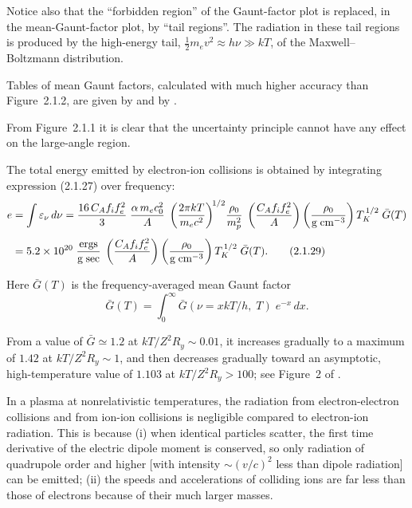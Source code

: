 Notice also that the ``forbidden region'' of the Gaunt-factor plot is replaced, in
the mean-Gaunt-factor plot, by ``tail regions''.  The radiation in these tail regions
is produced by the high-energy tail, $\frac{1}{2}m_e v^2 \approx h\nu \gg kT$, of the Maxwell--Boltzmann
distribution.

Tables of mean Gaunt factors, calculated with much higher accuracy than
Figure~2.1.2, are given by \citet{Green1959} and by \citet{Karzas1961}.

From Figure~2.1.1 it is clear that the uncertainty principle cannot have any
effect on the large-angle region.


The total energy emitted by electron-ion collisions is obtained by integrating
expression (2.1.27) over frequency:
\begin{align}
e &= \int \varepsilon_\nu\,d\nu
= \frac{16\,C_A f_i f_e^2}{3}\;
\frac{\alpha\,m_e c^2_0}{A}\;
\left(\frac{2\pi kT}{m_e c^2}\right)^{\!1/2}\!
\frac{\rho_0}{m_p^2}\;
\left(\frac{C_A f_i f_e^2}{A}\right)
\left(\frac{\rho_0}{\text{g\;cm}^{-3}}\right)
T_K^{\,1/2}\;\bar{G}(T)
\notag\\[4pt]
&= 5.2 \times 10^{20}\;
\frac{\text{ergs}}{\text{g\;sec}}\;
\left(\frac{C_A f_i f_e^2}{A}\right)
\left(\frac{\rho_0}{\text{g\;cm}^{-3}}\right)
T_K^{\,1/2}\;\bar{G}(T).
\tag{2.1.29}
\end{align}

Here $\bar{G}(T)$ is the frequency-averaged mean Gaunt factor
\begin{equation}
\bar{G}(T) = \int_0^\infty \bar{G}(\nu = xkT/h,\;T)\;e^{-x}\,dx.
\tag{2.1.30}
\end{equation}

From a value of $\bar{G} \simeq 1.2$ at $kT/Z^2 R_y \sim 0.01$, it increases gradually to a maximum
of $1.42$ at $kT/Z^2 R_y \sim 1$, and then decreases gradually toward an asymptotic,
high-temperature value of $1.103$ at $kT/Z^2 R_y > 100$; see Figure~2 of \citet{Green1959}.

In a plasma at nonrelativistic temperatures, the radiation from electron-electron
collisions and from ion-ion collisions is negligible compared to electron-ion
radiation.  This is because (i) when identical particles scatter, the first time
derivative of the electric dipole moment is conserved, so only radiation of
quadrupole order and higher [with intensity $\sim(v/c)^2$ less than dipole radiation]
can be emitted; (ii) the speeds and accelerations of colliding ions are far less than
those of electrons because of their much larger masses.


